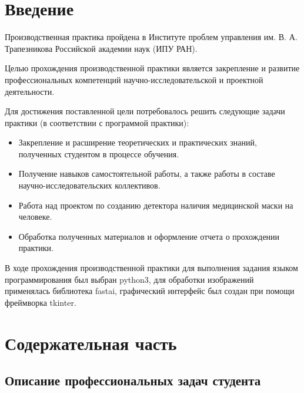 \documentclass[a4paper,14pt]{article}
\begin{document}
	 
	
	\tableofcontents
	\pagebreak
	
	\section{Введение}
	
	Производственная практика пройдена в Институте проблем управления им. В. А. Трапезникова Российской академии наук (ИПУ РАН).
	
	Целью прохождения производственной практики является закрепление и развитие профессиональных компетенций научно-исследовательской и проектной деятельности.
	
	Для достижения поставленной цели потребовалось решить следующие задачи практики (в соответствии с программой практики):
	\begin{itemize}
		\item Закрепление и расширение теоретических и практических знаний, полученных студентом в процессе обучения.
		
		
		\item Получение навыков самостоятельной работы, а также работы в составе научно-исследовательских коллективов.
		
		\item Работа над проектом по созданию детектора наличия медицинской маски на человеке.
		
		\item Обработка полученных материалов и оформление отчета о прохождении практики.
	\end{itemize}
	
	В ходе прохождения производственной практики для выполнения задания языком программирования был выбран python3, для обработки изображений применялась библиотека fastai, графический интерфейс был создан при помощи фреймворка tkinter.
	
	\pagebreak
	\section{Содержательная часть}
	
	\subsection{Описание профессиональных задач студента}
	
\end{document}
